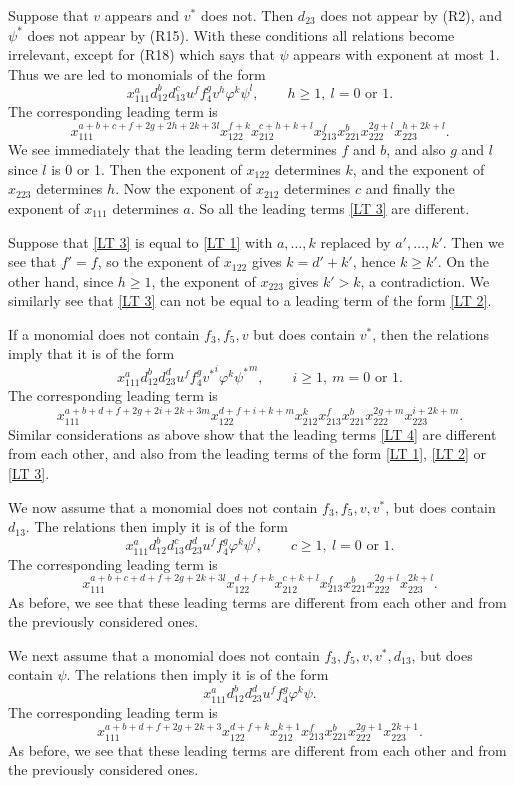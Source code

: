 \documentclass[reqno,11pt]{amsart}
\theoremstyle{remark}
\theoremstyle{definition}
\numberwithin{equation}{section}
\newcommand{\eq}{\begin{equation}}
\newcommand{\eeq}{\end{equation}}
\begin{document}
Suppose that $v$ appears and $v^*$ does not. Then $d_{23}$ does not appear by (R2), and $\psi^*$ does not appear by (R15). With these conditions all relations become irrelevant, except for (R18) which says that $\psi$ appears with exponent at most 1. Thus we are led to monomials of the form
\eq\label{mono 3}
x_{111}^ad_{12}^bd_{13}^c u^f f_4^g v^h \varphi^k\psi^l,\qquad h\geq 1,\ l=0\text{ or }1.
\eeq
The corresponding leading term is
\eq\label{LT 3}
x_{111}^{a+b+c+f+2g+2h+2k+3l}x_{122}^{f+k}x_{212}^{c+h+k+l}x_{213}^{f}x_{221}^bx_{222}^{2g+l}x_{223}^{h+2k+l}.
\eeq
We see immediately that the leading term determines $f$ and $b$, and also $g$ and $l$ since $l$ is 0 or 1. Then the exponent of $x_{122}$ determines $k$, and the exponent of $x_{223}$ determines $h$. Now the exponent of $x_{212}$ determines $c$ and finally the exponent of $x_{111}$ determines $a$. So all the leading terms \eqref{LT 3} are different. 

Suppose that \eqref{LT 3} is equal to \eqref{LT 1} with $a,\dots,k$ replaced by $a',\dots,k'$. Then we see that $f'=f$, so the exponent of $x_{122}$ gives $k=d'+k'$, hence $k\geq k'$. On the other hand, since $h\geq 1$, the exponent of $x_{223}$ gives $k'>k$, a contradiction. We similarly see that \eqref{LT 3} can not be equal to a leading term of the form \eqref{LT 2}.

If a monomial does not contain $f_3,f_5,v$ but does contain $v^*$, then the relations imply that it is of the form
\eq\label{mono 4}
x_{111}^ad_{12}^bd_{23}^d u^f f_4^g {v^*}^i \varphi^k{\psi^*}^m,\qquad i\geq 1,\ m=0\text{ or }1.
\eeq
The corresponding leading term is
\eq\label{LT 4}
x_{111}^{a+b+d+f+2g+2i+2k+3m}x_{122}^{d+f+i+k+m}x_{212}^kx_{213}^{f}x_{221}^bx_{222}^{2g+m}x_{223}^{i+2k+m}.
\eeq
Similar considerations as above show that the leading terms \eqref{LT 4} are different from each other, and also from the leading terms of the form \eqref{LT 1}, \eqref{LT 2} or \eqref{LT 3}.

We now assume that a monomial does not contain $f_3,f_5,v,v^*$, but does contain $d_{13}$. The relations then imply it is of the form
\eq\label{mono 5}
x_{111}^ad_{12}^bd_{13}^cd_{23}^d u^f f_4^g  \varphi^k\psi^l,\qquad c\geq 1,\ l=0\text{ or }1.
\eeq
The corresponding leading term is
\eq\label{LT 5}
x_{111}^{a+b+c+d+f+2g+2k+3l}x_{122}^{d+f+k}x_{212}^{c+k+l}x_{213}^{f}x_{221}^bx_{222}^{2g+l}x_{223}^{2k+l}.
\eeq
As before, we see that these leading terms are different from each other and from the previously considered ones.


We next assume that a monomial does not contain $f_3,f_5,v,v^*,d_{13}$, but does contain $\psi$. The relations then imply it is of the form
\eq\label{mono 6}
x_{111}^ad_{12}^bd_{23}^d u^f f_4^g  \varphi^k\psi.
\eeq
The corresponding leading term is
\eq\label{LT 6}
x_{111}^{a+b+d+f+2g+2k+3}x_{122}^{d+f+k}x_{212}^{k+1}x_{213}^{f}x_{221}^bx_{222}^{2g+1}x_{223}^{2k+1}.
\eeq
As before, we see that these leading terms are different from each other and from the previously considered ones.
\end{document}

